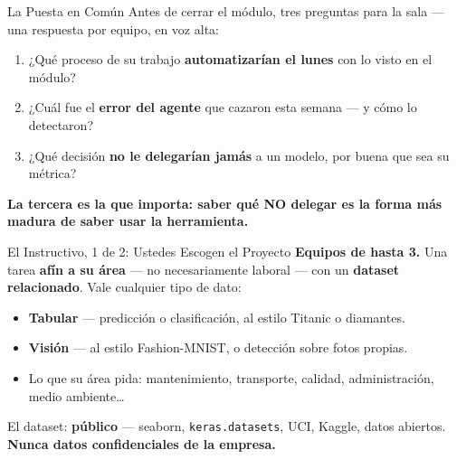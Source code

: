 \documentclass[aspectratio=169, 11pt]{beamer}
\begin{document}
\begin{frame}[shrink=5]{La Puesta en Común}
  \vspace{2pt}
  {\footnotesize\color{textMuted}
   Antes de cerrar el módulo, tres preguntas para la sala --- una respuesta
   por equipo, en voz alta:}
  \vspace{6pt}
  {\footnotesize\color{textMuted}
  \begin{enumerate}\setlength{\itemsep}{8pt}
    \item ¿Qué proceso de su trabajo \textbf{automatizarían el lunes} con
          lo visto en el módulo?
    \item ¿Cuál fue el \textbf{error del agente} que cazaron esta semana
          --- y cómo lo detectaron?
    \item ¿Qué decisión \textbf{no le delegarían jamás} a un modelo, por
          buena que sea su métrica?
  \end{enumerate}}
  \vspace{6pt}
  \begin{tcolorbox}[colback=arcaGray, colframe=arcaDark, boxrule=0pt,
    leftrule=3pt, arc=3pt, left=8pt, right=8pt, top=4pt, bottom=4pt]
    {\scriptsize\color{arcaDark}\bfseries
     La tercera es la que importa: saber qué NO delegar es la forma más
     madura de saber usar la herramienta.}
  \end{tcolorbox}
\end{frame}

\begin{frame}[shrink=5]{El Instructivo, 1 de 2: Ustedes Escogen el Proyecto}
  \vspace{2pt}
  {\footnotesize\color{textMuted}
   \textbf{Equipos de hasta 3.} Una tarea \textbf{afín a su área} --- no
   necesariamente laboral --- con un \textbf{dataset relacionado}. Vale
   cualquier tipo de dato:}
  \vspace{4pt}
  {\footnotesize\color{textMuted}
  \begin{itemize}\setlength{\itemsep}{4pt}
    \item[{\color{arcaRed}\scriptsize\faTable}]
      \textbf{Tabular} --- predicción o clasificación, al estilo Titanic o
      diamantes.
    \item[{\color{arcaRed}\scriptsize\faCamera}]
      \textbf{Visión} --- al estilo Fashion-MNIST, o detección sobre fotos
      propias.
    \item[{\color{arcaRed}\scriptsize\faIndustry}]
      Lo que su área pida: mantenimiento, transporte, calidad,
      administración, medio ambiente\ldots
  \end{itemize}}
  \vspace{5pt}
  \begin{tcolorbox}[colback=arcaGray, colframe=arcaRed, boxrule=0pt,
    leftrule=4pt, arc=3pt, left=10pt, right=10pt, top=5pt, bottom=5pt]
    {\footnotesize\color{textMuted}
     El dataset: \textbf{público} --- seaborn, \texttt{keras.datasets},
     UCI, Kaggle, datos abiertos. \textbf{\color{arcaRed}Nunca datos
     confidenciales de la empresa.}}
  \end{tcolorbox}
\end{frame}
\end{document}
